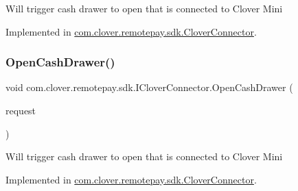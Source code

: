 Will trigger cash drawer to open that is connected to Clover Mini 



Implemented in \hyperlink{classcom_1_1clover_1_1remotepay_1_1sdk_1_1_clover_connector_aeeba2f27e901c6f105dbd9cdc624bd2c}{com.\+clover.\+remotepay.\+sdk.\+Clover\+Connector}.

\mbox{\label{interfacecom_1_1clover_1_1remotepay_1_1sdk_1_1_i_clover_connector_a9e5e3aeeb855129b4c176c13c7c632c0}} 
\subsubsection{\texorpdfstring{Open\+Cash\+Drawer()}{OpenCashDrawer()}\hspace{0.1cm}{\footnotesize\ttfamily [2/2]}}
{\footnotesize\ttfamily void com.\+clover.\+remotepay.\+sdk.\+I\+Clover\+Connector.\+Open\+Cash\+Drawer (\begin{DoxyParamCaption}\item[{\hyperlink{classcom_1_1clover_1_1remotepay_1_1sdk_1_1_open_cash_drawer_request}{Open\+Cash\+Drawer\+Request}}]{request }\end{DoxyParamCaption})}



Will trigger cash drawer to open that is connected to Clover Mini 



Implemented in \hyperlink{classcom_1_1clover_1_1remotepay_1_1sdk_1_1_clover_connector_afe1e4de054f3bd0949e3d75730fc168f}{com.\+clover.\+remotepay.\+sdk.\+Clover\+Connector}.

\mbox{\label{interfacecom_1_1clover_1_1remotepay_1_1sdk_1_1_i_clover_connector_aa41978ea2b8048ff23ab931752129eb9}} 
